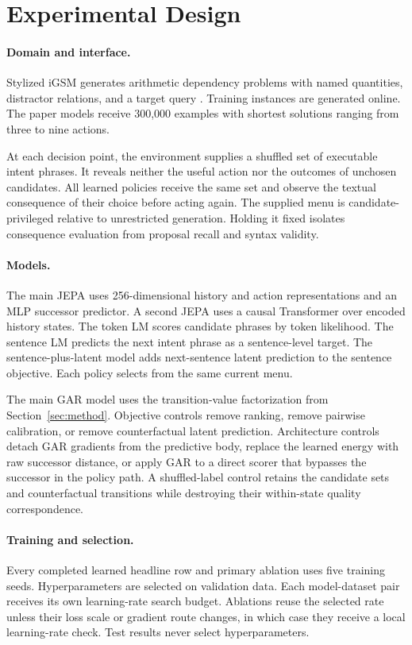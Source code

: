 \section{Experimental Design}
\label{sec:experiments}

\paragraph{Domain and interface.}
Stylized iGSM generates arithmetic dependency problems with named quantities, distractor relations, and a target query \citep{igsm2025}. Training instances are generated online. The paper models receive 300,000 examples with shortest solutions ranging from three to nine actions.

At each decision point, the environment supplies a shuffled set of executable intent phrases. It reveals neither the useful action nor the outcomes of unchosen candidates. All learned policies receive the same set and observe the textual consequence of their choice before acting again. The supplied menu is candidate-privileged relative to unrestricted generation. Holding it fixed isolates consequence evaluation from proposal recall and syntax validity.

\paragraph{Models.}
The main JEPA uses 256-dimensional history and action representations and an MLP successor predictor. A second JEPA uses a causal Transformer over encoded history states. The token LM scores candidate phrases by token likelihood. The sentence LM predicts the next intent phrase as a sentence-level target. The sentence-plus-latent model adds next-sentence latent prediction to the sentence objective. Each policy selects from the same current menu.

The main GAR model uses the transition-value factorization from Section~\ref{sec:method}. Objective controls remove ranking, remove pairwise calibration, or remove counterfactual latent prediction. Architecture controls detach GAR gradients from the predictive body, replace the learned energy with raw successor distance, or apply GAR to a direct scorer that bypasses the successor in the policy path. A shuffled-label control retains the candidate sets and counterfactual transitions while destroying their within-state quality correspondence.

\paragraph{Training and selection.}
Every completed learned headline row and primary ablation uses five training seeds. Hyperparameters are selected on validation data. Each model-dataset pair receives its own learning-rate search budget. Ablations reuse the selected rate unless their loss scale or gradient route changes, in which case they receive a local learning-rate check. Test results never select hyperparameters.

